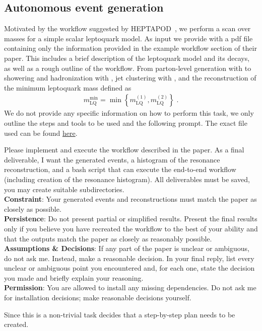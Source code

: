 \documentclass[submission, Phys]{SciPost}
\begin{document}
\subsection{Autonomous event generation}
\label{sec:apps_auto}

Motivated by the workflow suggested by HEPTAPOD~\cite{Menzo:2025cim}, we perform a scan over masses for a simple scalar leptoquark model. As input we provide \ma with a pdf file containing only the information provided in the example workflow section of their paper. This includes a brief description of the leptoquark model and its decays, as well as a rough outline of the workflow. From parton-level generation with \mg to showering and hadronization with \pythia, jet clustering with \fastjet, and the reconstruction of the minimum leptoquark mass defined as
%
\begin{align}
    m_{\mathrm{LQ}}^{\mathrm{min}} = \min \left\{m_{\mathrm{LQ}}^{(1)},m_{\mathrm{LQ}}^{(2)}\right\} \; .
\end{align}
%
We do not provide any specific information on how to perform this task, we only outline the steps and tools to be used and the following prompt. The exact file used can be found \href{https://github.com/heidelberg-hepml/MadAgents/blob/main/supplementary/autonomous_generation/heptapod_input.pdf}{here}.

\begin{userblock}[User]
Please implement and execute the workflow described in the paper.
As a final deliverable, I want the generated events, a histogram of the resonance reconstruction, and a bash script that can execute the end-to-end workflow (including creation of the resonance histogram).
All deliverables must be saved, you may create suitable subdirectories.\\

\textbf{Constraint}:
Your generated events and reconstructions must match the paper as closely as possible.\\

\textbf{Persistence}:
Do not present partial or simplified results. Present the final results only if you believe you have recreated the workflow to the best of your ability and that the outputs match the paper as closely as reasonably possible.\\

\textbf{Assumptions \& Decisions}:
If any part of the paper is unclear or ambiguous, do not ask me. Instead, make a reasonable decision. In your final reply, list every unclear or ambiguous point you encountered and, for each one, state the decision you made and briefly explain your reasoning.\\

\textbf{Permission}:
You are allowed to install any missing dependencies. Do not ask me for installation decisions; make reasonable decisions yourself.

\end{userblock}
%
Since this is a non-trivial task \ma decides that a step-by-step plan needs to be created.
\end{document}
